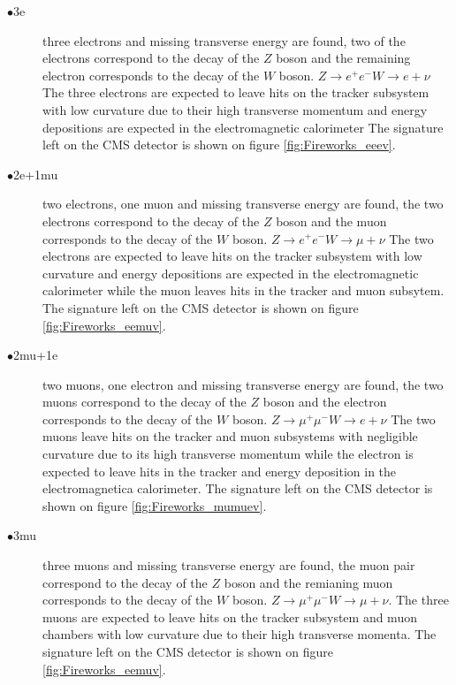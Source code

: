 \begin{description}
\item[$\bullet$3e] three electrons and missing transverse energy are found, two of the
  electrons correspond to the decay of the $Z$ boson and the remaining electron corresponds
  to the decay of the $W$ boson. $Z\rightarrow e^{+}e^{-} W\rightarrow e+\nu$
  The three electrons are expected to leave hits on the
  tracker subsystem with low curvature due to their high transverse momentum and
  energy depositions are expected in the electromagnetic calorimeter
  The signature left on the CMS detector is shown on figure \ref{fig:Fireworks_eeev}.
\item[$\bullet$2e+1mu] two electrons, one muon and missing transverse energy are found,
  the two electrons correspond to the decay of the $Z$ boson and the muon corresponds to the
  decay of the $W$ boson. $Z\rightarrow e^{+}e^{-} W\rightarrow \mu+\nu$ The two electrons are
  expected to leave hits on the tracker subsystem with low curvature and energy
  depositions are expected in the electromagnetic calorimeter while the muon leaves
  hits in the tracker and muon subsytem. The signature left on the CMS
  detector is shown on figure \ref{fig:Fireworks_eemuv}.
\item[$\bullet$2mu+1e] two muons, one electron and missing transverse energy are found,
  the two muons correspond to the decay of the $Z$ boson and the electron corresponds to the
  decay of the $W$ boson. $Z\rightarrow \mu^{+}\mu^{-} W\rightarrow e+\nu$ The two
  muons leave hits on the tracker and muon subsystems with negligible curvature due
  to its high transverse momentum while the electron is expected to leave hits in
  the tracker and energy deposition in the electromagnetica calorimeter.
  The signature left on the CMS detector is shown on figure \ref{fig:Fireworks_mumuev}.
\item[$\bullet$3mu] three muons and missing transverse energy are found, the muon pair
  correspond to the decay of the $Z$ boson and the remianing muon corresponds
  to the decay of the $W$ boson. $Z\rightarrow \mu^{+}\mu^{-} W\rightarrow \mu+\nu$.
  The three muons are expected to leave hits on the tracker subsystem and muon chambers
  with low curvature due to their high transverse momenta. The signature
  left on the CMS detector is shown on figure \ref{fig:Fireworks_eemuv}.
\end{description}

